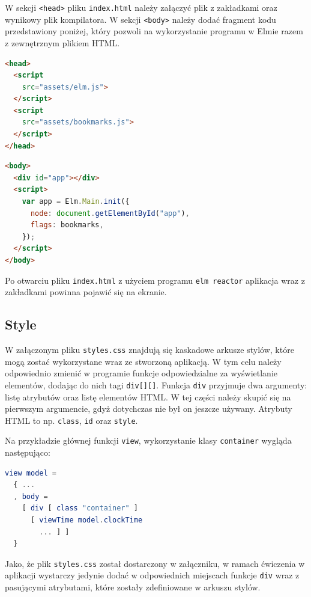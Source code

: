 \documentclass[twoside,a4paper]{report}
\begin{document}
W sekcji \texttt{<head>} pliku \texttt{index.html} należy załączyć plik z zakładkami oraz wynikowy plik kompilatora.
W sekcji \texttt{<body>} należy dodać fragment kodu przedstawiony poniżej, który pozwoli na wykorzystanie programu w Elmie razem z zewnętrznym plikiem HTML\@.

\vspace{.5cm}
\noindent
\begin{minipage}{.41\textwidth}
\begin{lstlisting}[language=html]
<head>
  <script
    src="assets/elm.js">
  </script>
  <script
    src="assets/bookmarks.js">
  </script>
</head>
\end{lstlisting}
\end{minipage}\hfill
\begin{minipage}{.55\textwidth}
\begin{lstlisting}[language=html]
<body>
  <div id="app"></div>
  <script>
    var app = Elm.Main.init({
      node: document.getElementById("app"),
      flags: bookmarks,
    });
  </script>
</body>
\end{lstlisting}
\end{minipage}\hfill

Po otwarciu pliku \texttt{index.html} z użyciem programu \texttt{elm reactor} aplikacja wraz z zakładkami powinna pojawić się na ekranie.

\subsection*{Style}
W załączonym pliku \texttt{styles.css} znajdują się kaskadowe arkusze stylów, które mogą zostać wykorzystane wraz ze stworzoną aplikacją.
W tym celu należy odpowiednio zmienić w programie funkcje odpowiedzialne za wyświetlanie elementów, dodając do nich tagi \texttt{div[][]}.
Funkcja \texttt{div} przyjmuje dwa argumenty: listę atrybutów oraz listę elementów HTML\@.
W tej części należy skupić się na pierwszym argumencie, gdyż dotychczas nie był on jeszcze używany.
Atrybuty HTML to np. \texttt{class}, \texttt{id} oraz \texttt{style}.

Na przykładzie głównej funkcji \texttt{view}, wykorzystanie klasy \texttt{container} wygląda następująco:
\begin{lstlisting}[language=Elm]
view model =
  { ...
  , body =
    [ div [ class "container" ]
      [ viewTime model.clockTime
        ... ] ]
  }
\end{lstlisting}

Jako, że plik \texttt{styles.css} został dostarczony w załączniku, w ramach ćwiczenia w aplikacji wystarczy jedynie dodać w odpowiednich miejscach funkcje \texttt{div} wraz z pasującymi atrybutami, które zostały zdefiniowane w arkuszu stylów.
\end{document}
